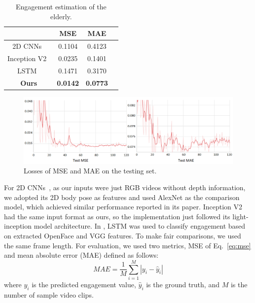 \documentclass[VANCOUVER,STIX1COL]{WileyNJD-v2}
\begin{document}
\begin{table}[htb]
  \centering
  \caption{Engagement estimation of the elderly.}
  \label{t:main_results}
  \begin{tabular}{cccc}
  \toprule
  \textbf{} & \textbf{MSE} & \textbf{MAE} \\
  \midrule
  2D CNNs~\cite{Anagnostopoulou2021Engagement} & 0.1104 & 0.4123 \\
  Inception V2~\cite{Saleh2021Improving} & 0.0235 & 0.1401 \\
  LSTM~\cite{Steinert2020Engagement} & 0.1471 & 0.3170 \\
  \midrule
  \textbf{Ours}& \textbf{0.0142} & \textbf{0.0773} \\ %
  \bottomrule
  \end{tabular}
\end{table}

\begin{figure}[t]
  \centering
  \includegraphics[width=0.9\linewidth]{assets/loss}
  \caption{Losses of MSE and MAE on the testing set.}
  \label{f:loss}
\end{figure}

For 2D CNNs~\cite{Anagnostopoulou2021Engagement}, as our inputs were just RGB videos without depth information, we adopted its 2D body pose as features and used AlexNet as the comparison model, which achieved similar performance reported in its paper. Inception V2~\cite{Saleh2021Improving} had the same input format as ours, so the implementation just followed its light-inception model architecture. In \cite{Steinert2020Engagement}, LSTM was used to classify engagement based on extracted OpenFace and VGG features. To make fair comparisons, we used the same frame length. For evaluation, we used two metrics, MSE of Eq.~\ref{eq:mse} and mean absolute error (MAE) defined as follows:
\begin{equation}
  M\!A\!E = \frac{1}{M}\sum_{i=1}^M|y_i-\hat{y}_i|
\end{equation}
where $y_i$ is the predicted engagement value, $\hat{y}_i$ is the ground truth, and $M$ is the number of sample video clips.
\end{document}
